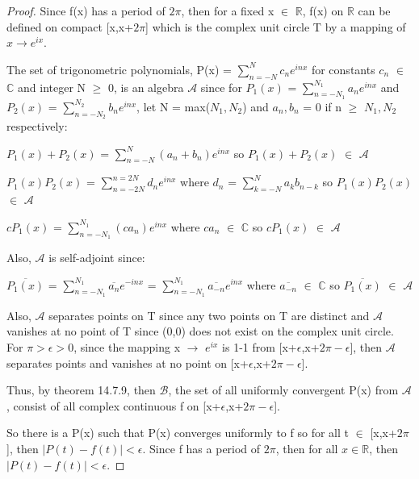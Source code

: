     \begin{proof}
        Since f(x) has a period of $2\pi$, then for a fixed x $\in$ $\mathbb{R}$,
        f(x) on $\mathbb{R}$ can be defined on compact [x,x+$2\pi$]
        which is the complex unit circle T by a mapping of $x \rightarrow e^{ix}$.

        The set of trigonometric polynomials,
        P(x) = $\sum_{n=-N}^N c_ne^{inx}$ for constants $c_n$ $\in$ $\mathbb{C}$
        and integer N $\geq$ 0, is an algebra $\mathscr{A}$ since for
        $P_1(x)$ = $\sum_{n=-N_1}^{N_1} a_ne^{inx}$
        and $P_2(x)$ = $\sum_{n=-N_2}^{N_2} b_ne^{inx}$,
        let N = max($N_1,N_2$) and $a_n,b_n$ = 0 if n $\geq$ $N_1,N_2$
        respectively:

        \hspace{0.5cm}
        $P_1(x) + P_2(x)$
        = $\sum_{n=-N}^{N} (a_n+b_n)e^{inx}$
        so $P_1(x) + P_2(x)$ $\in$ $\mathscr{A}$

        \hspace{0.5cm}
        $P_1(x) P_2(x)$
        = $\sum_{n=-2N}^{n=2N} d_ne^{inx}$ 
        where $d_n$ = $\sum_{k=-N}^N a_k b_{n-k}$
        so $P_1(x) P_2(x)$ $\in$ $\mathscr{A}$

        \hspace{0.5cm}
        $cP_1(x)$
        = $\sum_{n=-N_1}^{N_1} (ca_n)e^{inx}$
        where $ca_n$ $\in$ $\mathbb{C}$
        so $cP_1(x)$ $\in$ $\mathscr{A}$

        Also, $\mathscr{A}$ is self-adjoint since:

        \hspace{0.5cm}
        $\overline{P_1(x)}$
        = $\sum_{n=-N_1}^{N_1} \overline{a_n}e^{-inx}$
        = $\sum_{n=-N_1}^{N_1} \overline{a_{-n}}e^{inx}$
        where $\overline{a_{-n}}$ $\in$ $\mathbb{C}$
        so $\overline{P_1(x)}$ $\in$ $\mathscr{A}$

        Also, $\mathscr{A}$ separates points on T since any two points on T
        are distinct and $\mathscr{A}$ vanishes at no point of T since (0,0)
        does not exist on the complex unit circle.
        For $\pi > \epsilon > 0$, since the mapping x $\rightarrow$ $e^{ix}$
        is 1-1 from [x+$\epsilon$,x+$2\pi - \epsilon$], then
        $\mathscr{A}$ separates points and vanishes at no point on
        [x+$\epsilon$,x+$2\pi - \epsilon$].

        Thus, by {\color{red} theorem 14.7.9}, then $\mathscr{B}$,
        the set of all uniformly convergent P(x) from $\mathscr{A}$,
        consist of all complex continuous f on [x+$\epsilon$,x+$2\pi - \epsilon$].

        So there is a P(x) such that P(x) converges uniformly to f
        so for all t $\in$ [x,x+$2\pi$], then $|P(t) - f(t)| < \epsilon$.
        Since f has a period of $2\pi$, then for all $x \in \mathbb{R}$,
        then $|P(t) - f(t)| < \epsilon$.
    \end{proof}

